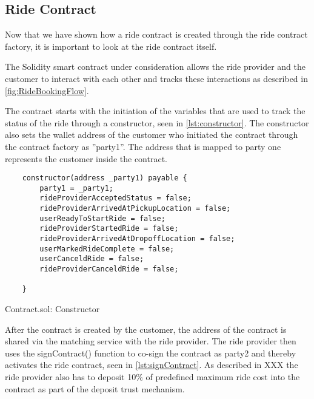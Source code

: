 \subsection{Ride Contract}
Now that we have shown how a ride contract is created through the ride contract factory, it is important to look at the ride contract itself.

The Solidity smart contract under consideration allows the ride provider and the customer to interact with each other and tracks these interactions as described in \ref{fig:RideBookingFlow}.

The contract starts with the initiation of the variables that are used to track the status of the ride through a constructor, seen in \ref{lst:constructor}. The constructor also sets the wallet address of the customer who initiated the contract through the contract factory as ''party1''. The address that is mapped to party one represents the customer inside the contract.

\lstset{
  basicstyle=\footnotesize\ttfamily,
  breaklines=true,
  numbers=left,
  firstnumber=30
}

\begin{Listing}
\begin{lstlisting}
    constructor(address _party1) payable {
        party1 = _party1;
        rideProviderAcceptedStatus = false;
        rideProviderArrivedAtPickupLocation = false;
        userReadyToStartRide = false;
        rideProviderStartedRide = false;
        rideProviderArrivedAtDropoffLocation = false;
        userMarkedRideComplete = false;
        userCanceldRide = false;
        rideProviderCanceldRide = false;

    }
\end{lstlisting}
  \caption{Contract.sol: Constructor}
  \label{lst:constructor}
\end{Listing}

After the contract is created by the customer, the address of the contract is shared via the matching service with the ride provider. The ride provider then uses the signContract() function to co-sign the contract as party2 and thereby activates the ride contract, seen in \ref{lst:signContract}. As described in XXX the ride provider also has to deposit 10\% of predefined  maximum ride cost into the contract as part of the deposit trust mechanism.

\lstset{
  basicstyle=\footnotesize\ttfamily,
  breaklines=true,
  numbers=left,
  firstnumber=76
}

